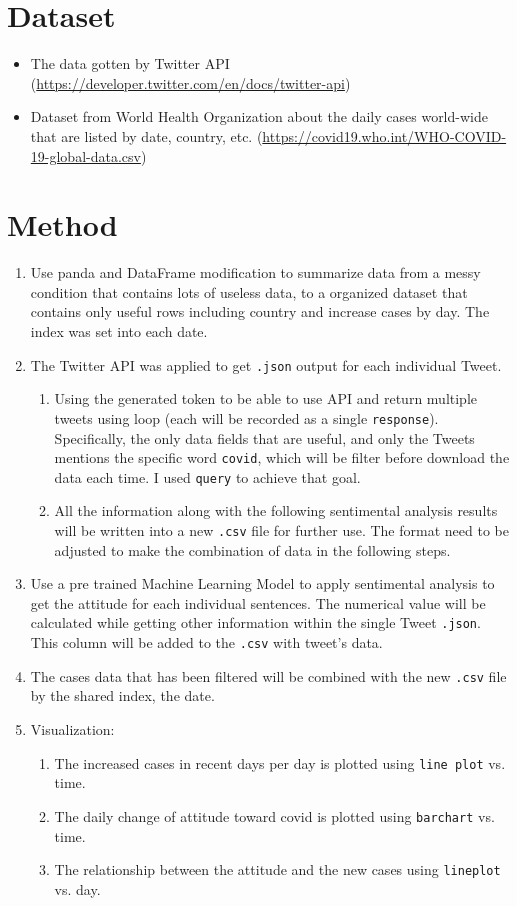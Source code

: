 \documentclass[a4paper, 12pt]{article}
\begin{document}
\section*{Dataset}
\begin{itemize}
    \item The data gotten by Twitter API (\url{https://developer.twitter.com/en/docs/twitter-api})
    \item Dataset from World Health Organization about the daily cases world-wide that are listed by date, country, etc. (\url{https://covid19.who.int/WHO-COVID-19-global-data.csv})
\end{itemize}

\section*{Method}
\begin{enumerate}
    \item Use panda and DataFrame modification to summarize data from a messy condition that contains lots of useless data, to a organized dataset that contains only useful rows including country and increase cases by day. The index was set into each date.
    \item The Twitter API was applied to get \texttt{.json} output for each individual Tweet.
    \begin{enumerate}
        \item Using the generated token to be able to use API and return multiple tweets using loop (each will be recorded as a single \texttt{response}). Specifically, the only data fields that are useful, and only the Tweets mentions the specific word \texttt{covid}, which will be filter before download the data each time. I used \texttt{query} to achieve that goal.
        \item All the information along with the following sentimental analysis results will be written into a new \texttt{.csv} file for further use. The format need to be adjusted to make the combination of data in the following steps.
    \end{enumerate}
    \item Use a pre trained Machine Learning Model to apply sentimental analysis to get the attitude for each individual sentences. The numerical value will be calculated while getting other information within the single Tweet \texttt{.json}. This column will be added to the \texttt{.csv} with tweet's data.
    \item The cases data that has been filtered will be combined with the new \texttt{.csv} file by the shared index, the date.
    \item Visualization:
    \begin{enumerate}
        \item The increased cases in recent days per day is plotted using \texttt{line plot} vs. time.
        \item The daily change of attitude toward covid is plotted using \texttt{barchart} vs. time.
        \item The relationship between the attitude and the new cases using \texttt{lineplot} vs. day.
    \end{enumerate}
\end{enumerate}
\end{document}
